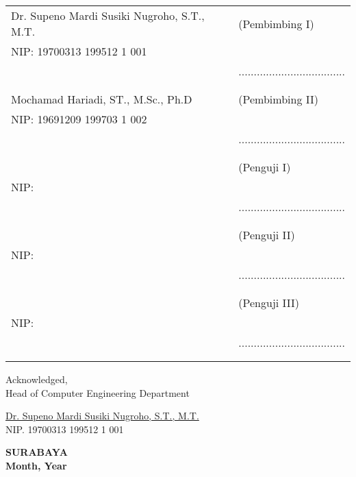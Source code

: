     \noindent
    \begin{tabularx}{\textwidth}{X l}
      Dr. Supeno Mardi Susiki Nugroho, S.T., M.T. & (Pembimbing I) \\
      NIP: 19700313 199512 1 001        & \\
      & ................................... \\
      &  \\
      &  \\
      Mochamad Hariadi, ST., M.Sc., Ph.D & (Pembimbing II) \\
      NIP: 19691209 199703 1 002        & \\
      & ................................... \\
      &  \\
      &  \\
        & (Penguji I) \\
      NIP:      & \\
      & ................................... \\
      &  \\
      &  \\
        & (Penguji II) \\
      NIP:       & \\
      & ................................... \\
      &  \\
      &  \\
                  & (Penguji III) \\
      NIP:       & \\
      & ................................... \\
      &  \\
      &  \\
    \end{tabularx}
  \endgroup


  \begin{center}
    Acknowledged, \\
    Head of Computer Engineering Department\\

    \vspace{8ex}

    \underline{Dr. Supeno Mardi Susiki Nugroho, S.T., M.T.} \\
    NIP. 19700313 199512 1 001
  \end{center}

  \begin{center}
    \textbf{SURABAYA\\Month, Year}
  \end{center}
\endgroup
